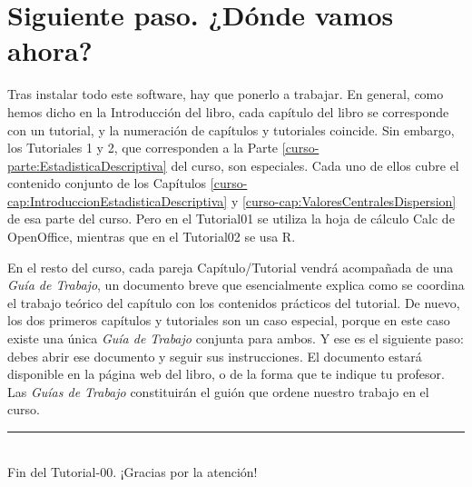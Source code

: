 \documentclass[10pt,a4paper]{article}\usepackage[]{graphicx}\usepackage[]{color}
\newcounter {cont01}
\begin{document}
\section{Siguiente paso. ¿Dónde vamos ahora?}

Tras instalar todo este software, hay que ponerlo a trabajar. En general, como hemos dicho en la Introducción del libro, cada capítulo del libro se corresponde con un tutorial, y la numeración de capítulos y tutoriales coincide. Sin embargo, los Tutoriales 1 y 2, que corresponden a la Parte \ref{curso-parte:EstadisticaDescriptiva} del curso, son especiales. Cada uno de ellos cubre el contenido conjunto de los Capítulos \ref{curso-cap:IntroduccionEstadisticaDescriptiva} y \ref{curso-cap:ValoresCentralesDispersion} de esa parte del curso. Pero en el Tutorial01 se utiliza la hoja de cálculo Calc de OpenOffice, mientras que en el Tutorial02 se usa R.

En el resto del curso, cada pareja Capítulo/Tutorial vendrá acompañada de una {\em Guía de Trabajo}, un documento breve que esencialmente explica como se coordina el trabajo teórico del capítulo con los contenidos prácticos del tutorial. De nuevo, los dos primeros capítulos y tutoriales son un caso especial, porque en este caso existe una única {\em Guía de Trabajo} conjunta para ambos. Y ese es el siguiente paso: debes abrir ese documento y seguir sus instrucciones. El documento estará disponible en la página web del libro, o de la forma que te indique tu profesor. Las {\em Guías de Trabajo} constituirán el guión que ordene nuestro trabajo en el curso.




\vspace{2cm} \hrule
\quad\\
Fin del Tutorial-00. ¡Gracias por la atención!
\end{document}
